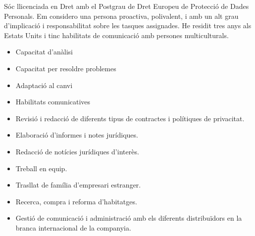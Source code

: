 \documentclass[10pt,a4paper,ragged2e,withhyper]{altacv}
\begin{document}
\thispagestyle{empty}
\clearpage
\makecvheader

\setlength{\columnsep}{1cm}
\begin{paracol}{2}

Sóc llicenciada en Dret amb el Postgrau de Dret Europeu de Protecció de Dades Personals. Em considero una persona proactiva, polivalent, i amb un alt grau d'implicació i responsabilitat sobre les tasques assignades. He residit tres anys als Estats Units i tinc habilitats de comunicació amb persones multiculturals.


\begin{itemize}
  \item Capacitat d'anàlisi
  \item Capacitat per resoldre problemes
  \item Adaptació al canvi
  \item Habilitats comunicatives
\end{itemize}

\switchcolumn

\begin{itemize}
  \item Revisió i redacció de diferents tipus de contractes i polítiques de privacitat.
  \item Elaboració d'informes i notes jurídiques.
  \item Redacció de notícies jurídiques d'interès.
  \item Treball en equip.
\end{itemize}

\begin{itemize}
  \item Trasllat de família d'empresari estranger.
  \item Recerca, compra i reforma d'habitatges.
\end{itemize}

\begin{itemize}
  \item Gestió de comunicació i administració amb els diferents distribuïdors en la branca internacional de la companyia.
\end{itemize}


\end{paracol}
\end{document}
